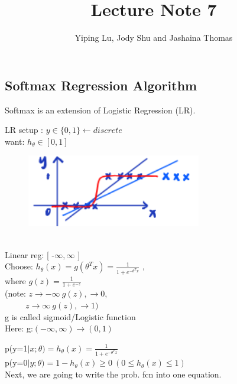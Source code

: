 \documentclass[11pt, oneside]{article}   	%
\title{Lecture Note 7 }
\author{Yiping Lu, Jody Shu and Jashaina Thomas}
\begin{document}
\begin{Large}
\maketitle
\section{Softmax Regression Algorithm}

Softmax is an extension of Logistic Regression (LR).

LR setup : $y \in \{0,1\} \leftarrow discrete$\\
want: $h_\theta \in [0,1]$
\begin{figure}[h] %
   \centering
   \includegraphics[width=3in]{logisticRegressionPlot} 
\end{figure}
\\
Linear reg: [ -$\infty, \infty$ ]\\
Choose:  $h_\theta (x)=g(\theta^T x)= \frac{1}{1+e^{-\theta^Tx}}$ ,
\\
where $g(z)=\frac{1}{1+e^{-z}}$
\\ (note: $z\rightarrow -\infty \ g(z), \rightarrow 0$,\\
            $\hspace{30pt} z\rightarrow \infty \ g(z), \rightarrow 1)$\\
g is called sigmoid/Logistic function\\
Here: g:$(-\infty, \infty) \rightarrow (0,1)$

p(y=1$\mid x; \theta)=h_\theta (x)=\frac{1}{1+e^{-\theta ^T x}}$\\
p(y=0$\mid y; \theta)=1-h_\theta (x) \geq 0 \ (0 \leq h_\theta (x) \leq 1)$
\\
Next, we are going to write the prob. fcn into one equation.










\end{Large}
\end{document}
